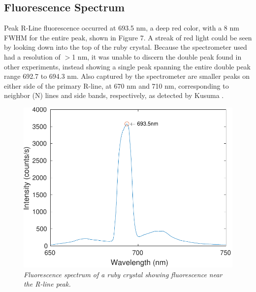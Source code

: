 \documentclass[11pt, a4paper, twocolumn]{article}
\begin{document}
\subsection*{Fluorescence Spectrum}

Peak R-Line fluorescence occurred at 693.5 nm, a deep red color, with a 8 nm FWHM for the entire peak, shown in Figure 7. A streak of red light could be seen by looking down into the top of the ruby crystal. Because the spectrometer used had a resolution of $>$1 nm, it was unable to discern the double peak found in other experiments, instead showing a single peak spanning the entire double peak range 692.7 to 694.3 nm. Also captured by the spectrometer are smaller peaks on either side of the primary R-line, at 670 nm and 710 nm, corresponding to neighbor (N) lines and side bands, respectively, as detected by Kusuma \cite{Kusuma}.
\begin{figure}[]
\includegraphics[width=\linewidth]{fluorescenceSpectrumFocused.pdf}
\caption{\textit{Fluorescence spectrum of a ruby crystal showing fluorescence near the R-line peak.}}
\label{fig:intensities}
\end{figure}
\end{document}
